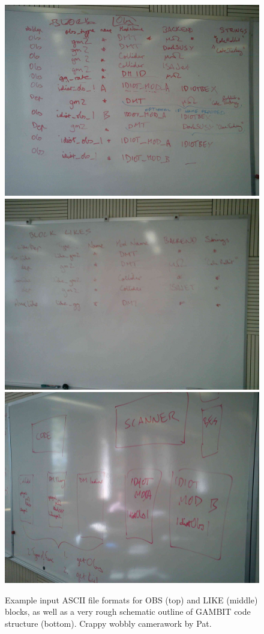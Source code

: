 \begin{figure}[tbp]
\includegraphics[width = 0.8\linewidth]{Code_Policies/fig1}\\
\includegraphics[width = 0.8\linewidth]{Code_Policies/fig2}\\
\includegraphics[width = 0.8\linewidth]{Code_Policies/fig3}
\caption{Example input ASCII file formats for OBS (top) and LIKE (middle) blocks, as well as a very rough schematic outline of GAMBIT code structure (bottom).  Crappy wobbly camerawork by Pat.}
\label{figure1}
\end{figure}


